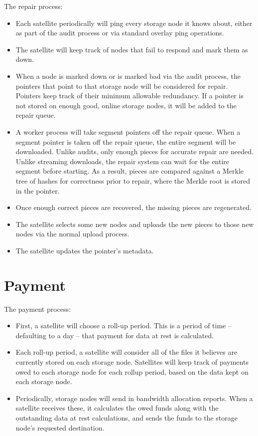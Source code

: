 \documentclass[11pt,fleqn,openany]{book}
\begin{document}
The repair process:

\begin{itemize}
\item Each satellite periodically will ping every storage node it knows
about, either as part of the audit process or via standard overlay ping operations.
\item The satellite will keep track of nodes that fail to respond and mark
  them as down.
\item When a node is marked down or is marked bad via the audit process, the
  pointers that point to that storage node will be considered for repair.
  Pointers
  keep track of their minimum allowable redundancy. If a pointer is not stored
  on enough good, online storage nodes, it will be added to the repair queue.
\item A worker process will take segment pointers off the repair queue. When
  a segment pointer is taken off the repair queue, the entire segment will be
  downloaded. Unlike audits, only enough pieces for accurate repair are needed.
  Unlike streaming downloads, the repair system can wait for the entire segment
  before starting. As a result, pieces are compared against a Merkle tree of
  hashes for correctness prior to repair, where the Merkle root is stored in
  the pointer.
\item Once enough correct pieces are recovered, the missing pieces are
  regenerated.
\item The satellite selects some new nodes and uploads the new pieces to
  those new nodes via the normal upload process.
\item The satellite updates the pointer's metadata.
\end{itemize}

\section{Payment}

The payment process:

\begin{itemize}
\item First, a satellite will choose a roll-up period. This is a period of
  time -- defaulting to a day -- that payment for data at rest is calculated.
\item Each roll-up period, a satellite will consider all of the files it
  believes are currently stored on each storage node. Satellites will keep track
of payments owed to each storage node for each rollup period, based on
the data kept on each storage node.
\item Periodically, storage nodes will send in bandwidth allocation reports.
When a
  satellite receives these, it calculates the owed funds along with the
  outstanding data at rest calculations, and sends the funds to the storage
  node's requested destination.
\end{itemize}
\end{document}
